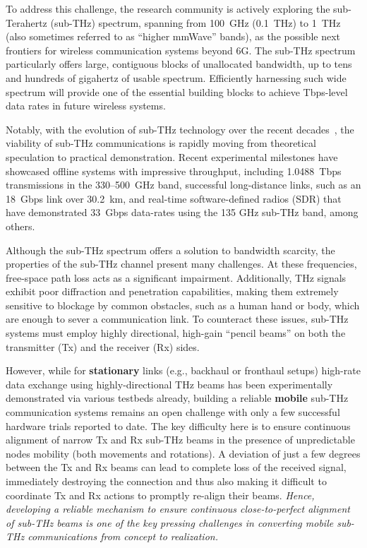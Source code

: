 \documentclass[fleqn,10pt]{wlscirep}
\begin{document}
To address this challenge, the research community is actively exploring the sub-Terahertz (sub-THz) spectrum, spanning from 100~GHz (0.1~THz) to 1~THz (also sometimes referred to as ``higher mmWave'' bands\cite{???}), as the possible next frontiers for wireless communication systems beyond 6G\cite{Kleine-Ostmann2011, Dang2020, DeAlwis2021, Samsung2020, Rappaport2019, 10494372}. The sub-THz spectrum particularly offers large, contiguous blocks of unallocated bandwidth, up to tens and hundreds of gigahertz of usable spectrum\cite{10171235, 9766110}. Efficiently harnessing such wide spectrum will provide one of the essential building blocks to achieve Tbps-level data rates in future wireless systems\cite{Nokia2022}.

Notably, with the evolution of sub-THz technology over the recent decades~\cite{???}, the viability of sub-THz communications is rapidly moving from theoretical speculation to practical demonstration. Recent experimental milestones have showcased offline systems with impressive throughput, including 1.0488~Tbps transmissions in the 330--500~GHz band, successful long-distance links, such as an 18~Gbps link over 30.2~km\cite{Yu2025Research}, and real-time software-defined radios (SDR) that have demonstrated 33~Gbps data-rates using the 135 GHz sub-THz band\cite{9536953,10704668}, among others.

Although the sub-THz spectrum offers a solution to bandwidth scarcity, the properties of the sub-THz channel present many challenges. At these frequencies, free-space path loss acts as a significant impairment\cite{10422992, Yu2025Research, Kleine-Ostmann2011}. Additionally, THz signals exhibit poor diffraction and penetration capabilities, making them extremely sensitive to blockage by common obstacles, such as a human hand or body, which are enough to sever a communication link\cite{10494372, Jornet2023}. To counteract these issues, sub-THz systems must employ highly directional, high-gain ``pencil beams'' on both the transmitter (Tx) and the receiver (Rx) sides\cite{Kleine-Ostmann2011}.

However, while for \textbf{stationary} links (e.g., backhaul or fronthaul setups) high-rate data exchange using highly-directional THz beams has been experimentally demonstrated via various testbeds already\cite{???,???,???}, building a reliable \textbf{mobile} sub-THz communication systems remains an open challenge with only a few successful hardware trials reported to date\cite{???,???}. The key difficulty here is to ensure continuous alignment of narrow Tx and Rx sub-THz beams in the presence of unpredictable nodes mobility (both movements and rotations)\cite{???,???,???}. A deviation of just a few degrees between the Tx and Rx beams can lead to complete loss of the received signal, immediately destroying the connection and thus also making it difficult to coordinate Tx and Rx actions to promptly re-align their beams. \emph{Hence, developing a reliable mechanism to ensure continuous close-to-perfect alignment of sub-THz beams is one of the key pressing challenges in converting mobile sub-THz communications from concept to realization\cite{10036372, Petrov2023Mobile, Azari2022}.}
\end{document}
